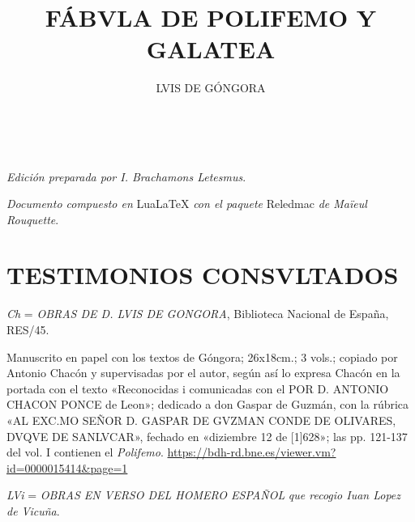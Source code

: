 \documentclass[11pt,a4paper,twoside]{article}
\title{FÁBVLA DE POLIFEMO Y GALATEA}
\author{\fontsize{14}{11.96}\selectfont LVIS DE GÓNGORA}
\date{\vspace{60pt}\fontsize{11}{11}\selectfont{TEXTO Y VARIANTES DE LA REDACCIÓN PRIMITIVA}\\\fontsize{40}{11}\selectfont{\vfill\LaTeX}}
\begin{document}
	{
			\maketitle
		}
		\newpage%

\hskip0pt
\vfill
\begin{flushright}
\textit{Edición preparada por I. Brachamons Letesmus}.
\end{flushright}

\begin{flushright}
\textit{Documento compuesto en} LuaLaTeX \textit{con el paquete} Reledmac \textit{de Maïeul Rouquette}.
\end{flushright}
\newpage

\tableofcontents
\newpage

\setcounter{page}{1}
\section*{\fontsize{13}{14.35}\selectfont TESTIMONIOS CONSVLTADOS}

\textit{Ch} = \textit{\fontsize{9}{11}\selectfont OBRAS DE D. LVIS DE GONGORA}, Biblioteca Nacional de España, RES/45.

Manuscrito en papel con los textos de Góngora; 26x18cm.; 3 vols.; copiado por Antonio Chacón y supervisadas por el autor, según así lo expresa Chacón en la portada con el texto «Reconocidas i comunicadas con el {\fontsize{9}{11}\selectfont POR D. ANTONIO CHACON PONCE} de Leon»; dedicado a don Gaspar de Guzmán, con la rúbrica «{\fontsize{9}{11}\selectfont AL EXC.MO SEÑOR D. GASPAR DE GVZMAN CONDE DE OLIVARES, DVQVE DE SANLVCAR}», fechado en «diziembre 12 de [1]628»; las pp. 121-137 del vol. I contienen el \textit{Polifemo}. \url{https://bdh-rd.bne.es/viewer.vm?id=0000015414&page=1}\vspace{5pt}

\textit{LVi} = \textit{\fontsize{9}{11}\selectfont \textit{OBRAS EN VERSO DEL HOMERO ESPAÑOL}} \textit{que recogio Iuan Lopez de Vicuña}.
\end{document}
